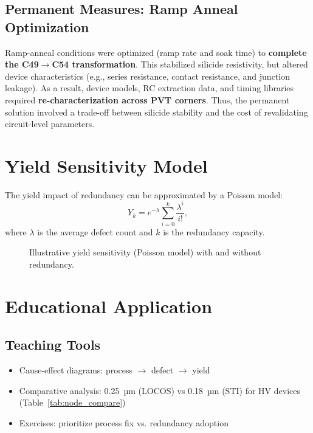 \documentclass[conference]{IEEEtran}
\begin{document}
\subsection{Permanent Measures: Ramp Anneal Optimization}
Ramp-anneal conditions were optimized (ramp rate and soak time)
to \textbf{complete the C49$\rightarrow$C54 transformation}. This
stabilized silicide resistivity, but altered device characteristics
(e.g., series resistance, contact resistance, and junction leakage).
As a result, device models, RC extraction data, and timing libraries
required \textbf{re-characterization across PVT corners}. Thus, the
permanent solution involved a trade-off between silicide stability and
the cost of revalidating circuit-level parameters.

\section{Yield Sensitivity Model}
The yield impact of redundancy can be approximated by a Poisson model:
\[
Y_k = e^{-\lambda} \sum_{i=0}^{k} \frac{\lambda^i}{i!},
\]
where $\lambda$ is the average defect count and $k$ is the redundancy capacity.

\begin{figure}[!t]
  \centering
  \caption{Illustrative yield sensitivity (Poisson model) with and without redundancy.}
  \label{fig:yield}
\end{figure}

\section{Educational Application}
\subsection{Teaching Tools}
\begin{itemize}
    \item Cause-effect diagrams: process $\rightarrow$ defect $\rightarrow$ yield
    \item Comparative analysis: 0.25~µm (LOCOS) vs 0.18~µm (STI) for HV devices (Table~\ref{tab:node_compare})
    \item Exercises: prioritize process fix vs. redundancy adoption
\end{itemize}
\end{document}
